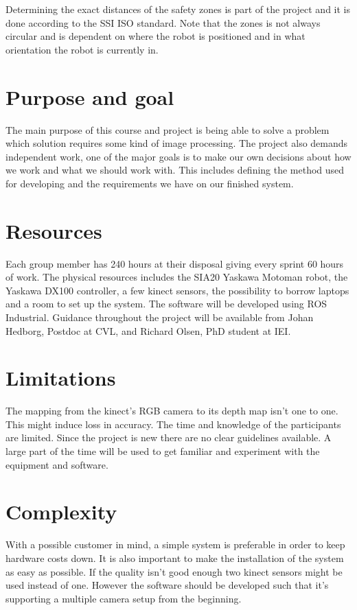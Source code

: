 \documentclass[10pt,a4paper]{article}
\begin{document}
Determining the exact distances of the safety zones is part of the project and it is done according to the SSI ISO standard. Note that the zones is not always circular and is dependent on where the robot is positioned and in what orientation the robot is currently in.

\section{Purpose and goal}
The main purpose of this course and project is being able to solve a problem which solution requires some kind of image processing.
The project also demands independent work, one of the major goals is to make our own decisions about how we work and what we should work with. This includes defining the method used for developing and the requirements we have on our finished system.

\section{Resources}
Each group member has 240 hours at their disposal giving every sprint 60 hours of work. The physical resources includes the SIA20 Yaskawa Motoman robot, the Yaskawa DX100 controller, a few kinect sensors, the possibility to borrow laptops and a room to set up the system. 
The software will be developed using ROS Industrial.
Guidance throughout the project will be available from Johan Hedborg, Postdoc at CVL, and Richard Olsen, PhD student at IEI.

\section{Limitations}
The mapping from the kinect’s RGB camera to its depth map isn’t one to one. This might induce loss in accuracy. 
The time and knowledge of the participants are limited. Since the project is new there are no clear guidelines available. A large part of the time will be used to get familiar and experiment with the equipment and software.

\section{Complexity}
With a possible customer in mind, a simple system is preferable in order to keep hardware costs down. It is also important to make the installation of the system as easy as possible. If the quality isn’t good enough two kinect sensors might be used instead of one. However the software should be developed such that it’s supporting a multiple camera setup from the beginning.
\end{document}
